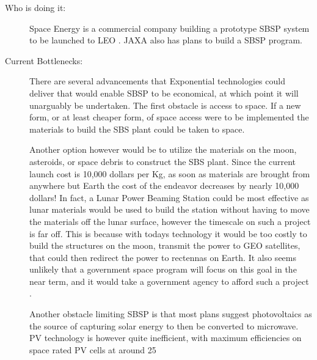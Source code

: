 \begin{description}
\item[Who is doing it:] Space  Energy is a commercial company building a prototype SBSP system to be  launched to LEO  \cite{SpaceEnergy2010}. JAXA also has plans to build a SBSP  program.
 
\item[Current Bottlenecks:] There  are several advancements that Exponential technologies could deliver  that would enable SBSP to be economical, at which point it will  unarguably be undertaken. The first obstacle is access to space. If a  new form, or at least cheaper form, of space access were to be  implemented the materials to build the SBS plant could be taken to  space.
 
Another option however would be to  utilize the materials on the moon, asteroids, or space debris to  construct the SBS plant. Since the current launch cost is 10,000 dollars  per Kg, as soon as materials are brought from anywhere but Earth the  cost of the endeavor decreases by nearly 10,000 dollars! In fact, a  Lunar Power Beaming Station could be most effective as lunar materials  would be used to build the station without having to move the materials  off the lunar surface, however the timescale on such a project is far  off. This is because with todays technology it would be too costly to  build the structures on the moon, transmit the power to GEO satellites,  that could then redirect the power to rectennas on Earth. It also seems  unlikely that a government space program will focus on this goal in the  near term, and it would take a government agency to afford such a  project \cite{Seboldt2004}.
 
Another obstacle limiting SBSP is  that most plans suggest photovoltaics as the source of capturing solar  energy to then be converted to microwave. PV technology is however quite  inefficient, with maximum efficiencies on space rated PV cells at  around 25%
 
\end{description}


